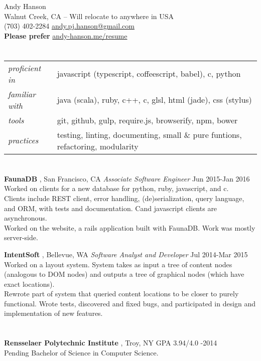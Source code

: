 \documentclass[margin]{res}
\newcommand{\sweetline}[1]{
	\setlength{\parskip}{1.5ex}
	\nointerlineskip
	\hspace{\fill}
	\resizebox{0.33\linewidth}{1.25ex}
	{
    	\begin{tikzpicture}
			\node (C) at (0,0) {};
			\node (D) at (9,0) {};
			\path (C) to [ornament=#1] (D);
		\end{tikzpicture}
	}
	\hspace{\fill}
	\par
	\nointerlineskip
}
\newcommand{\Sharp}{\nolinebreak\hspace{-.05em}\raisebox{.6ex}{\scriptsize\bf \#}}
\newcommand{\sex}[1]{\section{\fontsize{13}{13}\selectfont{#1}}}
\newcommand{\tit}[1]{{
	\fontsize{11}{12}
	\selectfont
	\textbf{#1}
}}
\newcommand{\vs}[0]{\vspace{2px}}
\begin{document}
{\centering
	\huge{Andy Hanson} \normalsize \\
	Walnut Creek, CA -- Will relocate to anywhere in USA \\
	(703) 402-2284 \quad \url{andy.pj.hanson@gmail.com} \\
	\textbf{Please prefer} \url{andy-hanson.me/resume} \\
}


\begin{resume}


\sex{skill}
\begin{tabularx}{\textwidth}{ | l X }
	\emph{proficient in} & javascript (typescript, coffeescript, babel), c\Sharp, python \vs \\
	\emph{familiar with} & java (scala), ruby, c++, c, glsl, html (jade), css (stylus) \vs \\
	\emph{tools} & git, github, gulp, require.js, browserify, npm, bower \vs \\
	\emph{practices} & testing, linting, documenting, small \& pure funtions, refactoring, modularity
\end{tabularx}

\sex{work}
	\tit{FaunaDB}, San Francisco, CA \enspace \emph{Associate Software Engineer} \hfill \textsf{Jun 2015-Jan 2016} \\
	Worked on clients for a new database for python, ruby, javascript, and c\Sharp. \\
	Clients include REST client, error handling, (de)serialization, query language, and ORM, with tests and documentation.
	C\Sharp and javascript clients are asynchronous. \\
	Worked on the website, a rails application built with FaunaDB. Work was mostly server-side.
	
	\tit{IntentSoft}, Bellevue, WA \enspace \emph{Software Analyst and Developer} \hfill \textsf{Jul 2014-Mar 2015} \\
	Worked on a layout system. System takes as input a tree of content nodes (analogous to DOM nodes) and outputs a tree of graphical nodes (which have exact locations). \\
	Rewrote part of system that queried content locations to be closer to purely functional.
	Wrote tests, discovered and fixed bugs, and participated in design and implementation of new features.

\sex{school}
	\tit{Rensselaer Polytechnic Institute}, Troy, NY \hfill \textsf{GPA 3.94/4.0 -2014} \\
	Pending Bachelor of Science in Computer Science.


\end{resume}
\end{document}
